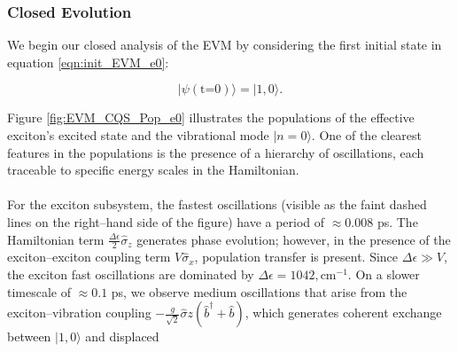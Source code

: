 \documentclass[11pt]{article}
\newcounter{subsubsubsection}[subsubsection]
\begin{document}
\subsubsection{Closed Evolution}


We begin our closed analysis of the EVM by considering the first initial state in equation \eqref{eqn:init_EVM_e0}:

\begin{equation*}
    |\psi (\text{t=0})\rangle = |1, 0\rangle.
\end{equation*}


\noindent Figure \ref{fig:EVM_CQS_Pop_e0} illustrates the populations of the effective exciton's excited state and the vibrational mode $|n=0\rangle$. One of the clearest features in the populations is the presence of a hierarchy of oscillations, each traceable to specific energy scales in the Hamiltonian. \\
\\
For the exciton subsystem, the fastest oscillations (visible as the faint dashed lines on the right--hand side of the figure) have a period of $\approx0.008$ ps. The Hamiltonian term $\tfrac{\Delta\epsilon}{2}\hat{\sigma}_z$ generates phase evolution; however, in the presence of the exciton--exciton coupling term $V\hat{\sigma}_x$, population transfer is present. Since $\Delta\epsilon \gg V$, the exciton fast oscillations are dominated by $\Delta\epsilon = 1042,\text{cm}^{-1}$. On a slower timescale of $\approx0.1$ ps, we observe medium oscillations that arise from the exciton--vibration coupling $-\tfrac{g}{\sqrt{2}}\hat{\sigma}z(\hat{b}^\dagger+\hat{b})$, which generates coherent exchange between $|1,0\rangle$ and displaced
\end{document}
